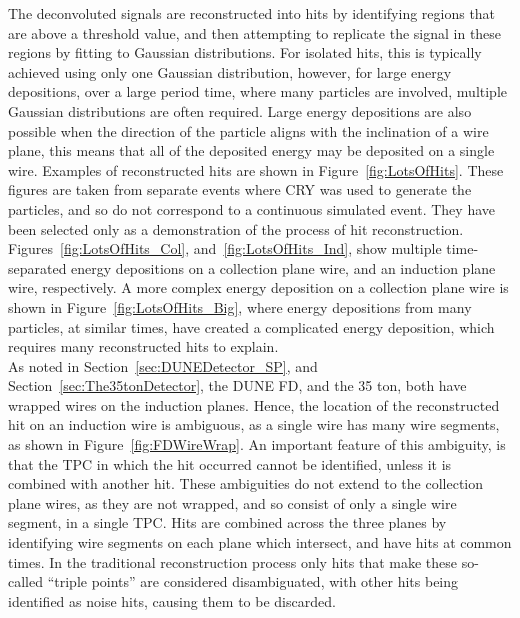 The deconvoluted signals are reconstructed into hits by identifying regions that are above a threshold value, and then attempting to replicate the signal in these regions by fitting to Gaussian distributions. For isolated hits, this is typically achieved using only one Gaussian distribution, however, for large energy depositions, over a large period time, where many particles are involved, multiple Gaussian distributions are often required. Large energy depositions are also possible when the direction of the particle aligns with the inclination of a wire plane, this means that all of the deposited energy may be deposited on a single wire. Examples of reconstructed hits are shown in Figure~\ref{fig:LotsOfHits}. These figures are taken from separate events where CRY was used to generate the particles, and so do not correspond to a continuous simulated event. They have been selected only as a demonstration of the process of hit reconstruction. Figures~\ref{fig:LotsOfHits_Col}, and~\ref{fig:LotsOfHits_Ind}, show multiple time-separated energy depositions on a collection plane wire, and an induction plane wire, respectively. A more complex energy deposition on a collection plane wire is shown in Figure~\ref{fig:LotsOfHits_Big}, where energy depositions from many particles, at similar times, have created a complicated energy deposition, which requires many reconstructed hits to explain. \\

As noted in Section~\ref{sec:DUNEDetector_SP}, and Section~\ref{sec:The35tonDetector}, the DUNE FD, and the 35 ton, both have wrapped wires on the induction planes. Hence, the location of the reconstructed hit on an induction wire is ambiguous, as a single wire has many wire segments, as shown in Figure~\ref{fig:FDWireWrap}. An important feature of this ambiguity, is that the TPC in which the hit occurred cannot be identified, unless it is combined with another hit. These ambiguities do not extend to the collection plane wires, as they are not wrapped, and so consist of only a single wire segment, in a single TPC. Hits are combined across the three planes by identifying wire segments on each plane which intersect, and have hits at common times. In the traditional reconstruction process only hits that make these so-called ``triple points'' are considered disambiguated, with other hits being identified as noise hits, causing them to be discarded. \\

